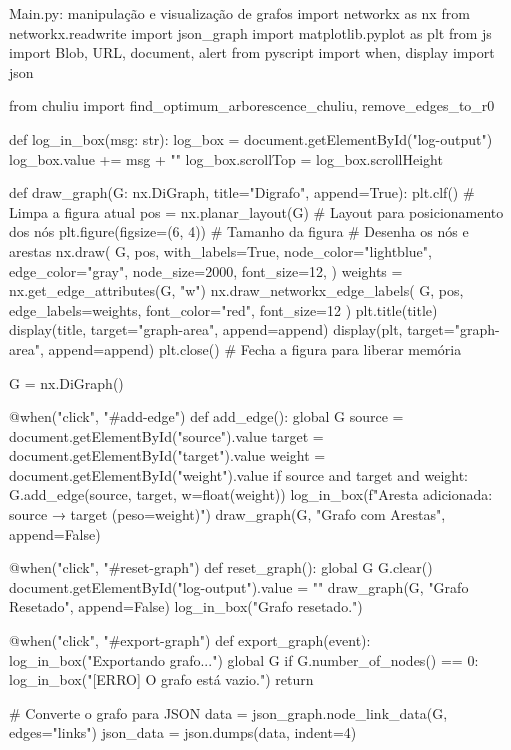 \documentclass[12pt,a4paper]{article}
\begin{document}
\begin{pybox}[label={lst:draw_graph}]{Main.py: manipulação e visualização de grafos}
import networkx as nx
from networkx.readwrite import json_graph
import matplotlib.pyplot as plt
from js import Blob, URL, document, alert
from pyscript import when, display
import json

from chuliu import find_optimum_arborescence_chuliu, remove_edges_to_r0

def log_in_box(msg: str):
    log_box = document.getElementById("log-output")
    log_box.value += msg + "\n"
    log_box.scrollTop = log_box.scrollHeight

def draw_graph(G: nx.DiGraph, title="Digrafo", append=True):
    plt.clf()  # Limpa a figura atual
    pos = nx.planar_layout(G)  # Layout para posicionamento dos nós
    plt.figure(figsize=(6, 4))  # Tamanho da figura
    # Desenha os nós e arestas
    nx.draw(
        G,
        pos,
        with_labels=True,
        node_color="lightblue",
        edge_color="gray",
        node_size=2000,
        font_size=12,
    )
    weights = nx.get_edge_attributes(G, "w")
    nx.draw_networkx_edge_labels(
        G, pos, edge_labels=weights, font_color="red", font_size=12
    )
    plt.title(title)
    display(title, target="graph-area", append=append)
    display(plt, target="graph-area", append=append)
    plt.close()  # Fecha a figura para liberar memória

G = nx.DiGraph()

@when("click", "#add-edge")
def add_edge():
    global G
    source = document.getElementById("source").value
    target = document.getElementById("target").value
    weight = document.getElementById("weight").value
    if source and target and weight:
        G.add_edge(source, target, w=float(weight))
        log_in_box(f"Aresta adicionada: {source} → {target} (peso={weight})")
        draw_graph(G, "Grafo com Arestas", append=False)

@when("click", "#reset-graph")
def reset_graph():
    global G
    G.clear()
    document.getElementById("log-output").value = ""
    draw_graph(G, "Grafo Resetado", append=False)
    log_in_box("Grafo resetado.")

@when("click", "#export-graph")
def export_graph(event):
    log_in_box("Exportando grafo...")
    global G
    if G.number_of_nodes() == 0:
        log_in_box("[ERRO] O grafo está vazio.")
        return

    # Converte o grafo para JSON
    data = json_graph.node_link_data(G, edges="links")
    json_data = json.dumps(data, indent=4)


\end{pybox}
\end{document}
